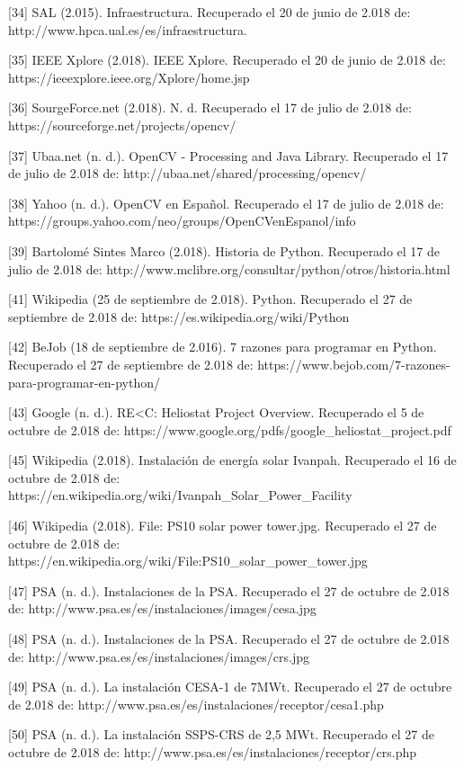 [34] SAL (2.015). Infraestructura. Recuperado el 20 de junio de 2.018 de: http://www.hpca.ual.es/es/infraestructura.

[35] IEEE Xplore (2.018). IEEE Xplore. Recuperado el 20 de junio de 2.018 de: https://ieeexplore.ieee.org/Xplore/home.jsp

[36] SourgeForce.net (2.018). N. d. Recuperado el 17 de julio de 2.018 de: https://sourceforge.net/projects/opencv/

[37] Ubaa.net (n. d.). OpenCV - Processing and Java Library. Recuperado el 17 de julio de 2.018 de: http://ubaa.net/shared/processing/opencv/

[38] Yahoo (n. d.). OpenCV en Español. Recuperado el 17 de julio de 2.018 de: https://groups.yahoo.com/neo/groups/OpenCVenEspanol/info

[39] Bartolomé Sintes Marco (2.018). Historia de Python. Recuperado el 17 de julio de 2.018 de: http://www.mclibre.org/consultar/python/otros/historia.html

[41] Wikipedia (25 de septiembre de 2.018). Python. Recuperado el 27 de septiembre de 2.018 de: https://es.wikipedia.org/wiki/Python

[42] BeJob (18 de septiembre de 2.016). 7 razones para programar en Python. Recuperado el 27 de septiembre de 2.018 de: https://www.bejob.com/7-razones-para-programar-en-python/

[43] Google (n. d.). RE<C: Heliostat Project Overview. Recuperado el 5 de octubre de 2.018 de: https://www.google.org/pdfs/google\_heliostat\_project.pdf

[45] Wikipedia (2.018). Instalación de energía solar Ivanpah. Recuperado el 16 de octubre de 2.018 de: https://en.wikipedia.org/wiki/Ivanpah\_Solar\_Power\_Facility

[46] Wikipedia (2.018). File: PS10 solar power tower.jpg. Recuperado el 27 de octubre de 2.018 de: https://en.wikipedia.org/wiki/File:PS10\_solar\_power\_tower.jpg

[47] PSA (n. d.). Instalaciones de la PSA. Recuperado el 27 de octubre de 2.018 de: http://www.psa.es/es/instalaciones/images/cesa.jpg

[48] PSA (n. d.). Instalaciones de la PSA. Recuperado el 27 de octubre de 2.018 de: http://www.psa.es/es/instalaciones/images/crs.jpg

[49] PSA (n. d.). La instalación CESA-1 de 7MWt. Recuperado el 27 de octubre de 2.018 de: http://www.psa.es/es/instalaciones/receptor/cesa1.php

[50] PSA (n. d.). La instalación SSPS-CRS de 2,5 MWt. Recuperado el 27 de octubre de 2.018 de: http://www.psa.es/es/instalaciones/receptor/crs.php

